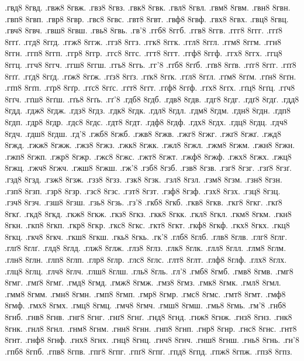 {.гвд8 8гвд.
.гвж8 8гвж.
.гвз8 8гвз.
.гвк8 8гвк.
.гвл8 8гвл.
.гвм8 8гвм.
.гвн8 8гвн.
.гвп8 8гвп.
.гвр8 8гвр.
.гвс8 8гвс.
.гвт8 8гвт.
.гвф8 8гвф.
.гвх8 8гвх.
.гвц8 8гвц.
.гвч8 8гвч.
.гвш8 8гвш.
.гвь8 8гвь.
.гв'8
.ггб8 8ггб.
.ггв8 8ггв.
.ггг8 8ггг.
.ггґ8 8ггґ.
.ггд8 8ггд.
.ггж8 8ггж.
.ггз8 8ггз.
.ггк8 8ггк.
.ггл8 8ггл.
.ггм8 8ггм.
.ггн8 8ггн.
.ггп8 8ггп.
.ггр8 8ггр.
.ггс8 8ггс.
.ггт8 8ггт.
.ггф8 8ггф.
.ггх8 8ггх.
.ггц8 8ггц.
.ггч8 8ггч.
.ггш8 8ггш.
.ггь8 8ггь.
.гг'8
.гґб8 8гґб.
.гґв8 8гґв.
.гґг8 8гґг.
.гґґ8 8гґґ.
.гґд8 8гґд.
.гґж8 8гґж.
.гґз8 8гґз.
.гґк8 8гґк.
.гґл8 8гґл.
.гґм8 8гґм.
.гґн8 8гґн.
.гґп8 8гґп.
.гґр8 8гґр.
.гґс8 8гґс.
.гґт8 8гґт.
.гґф8 8гґф.
.гґх8 8гґх.
.гґц8 8гґц.
.гґч8 8гґч.
.гґш8 8гґш.
.гґь8 8гґь.
.гґ'8
.гдб8 8гдб.
.гдв8 8гдв.
.гдг8 8гдг.
.гдґ8 8гдґ.
.гдд8 8гдд.
.гдж8 8гдж.
.гдз8 8гдз.
.гдк8 8гдк.
.гдл8 8гдл.
.гдм8 8гдм.
.гдн8 8гдн.
.гдп8 8гдп.
.гдр8 8гдр.
.гдс8 8гдс.
.гдт8 8гдт.
.гдф8 8гдф.
.гдх8 8гдх.
.гдц8 8гдц.
.гдч8 8гдч.
.гдш8 8гдш.
.гд'8
.гжб8 8гжб.
.гжв8 8гжв.
.гжг8 8гжг.
.гжґ8 8гжґ.
.гжд8 8гжд.
.гжж8 8гжж.
.гжз8 8гжз.
.гжк8 8гжк.
.гжл8 8гжл.
.гжм8 8гжм.
.гжн8 8гжн.
.гжп8 8гжп.
.гжр8 8гжр.
.гжс8 8гжс.
.гжт8 8гжт.
.гжф8 8гжф.
.гжх8 8гжх.
.гжц8 8гжц.
.гжч8 8гжч.
.гжш8 8гжш.
.гж'8
.гзб8 8гзб.
.гзв8 8гзв.
.гзг8 8гзг.
.гзґ8 8гзґ.
.гзд8 8гзд.
.гзж8 8гзж.
.гзз8 8гзз.
.гзк8 8гзк.
.гзл8 8гзл.
.гзм8 8гзм.
.гзн8 8гзн.
.гзп8 8гзп.
.гзр8 8гзр.
.гзс8 8гзс.
.гзт8 8гзт.
.гзф8 8гзф.
.гзх8 8гзх.
.гзц8 8гзц.
.гзч8 8гзч.
.гзш8 8гзш.
.гзь8 8гзь.
.гз'8
.гкб8 8гкб.
.гкв8 8гкв.
.гкг8 8гкг.
.гкґ8 8гкґ.
.гкд8 8гкд.
.гкж8 8гкж.
.гкз8 8гкз.
.гкк8 8гкк.
.гкл8 8гкл.
.гкм8 8гкм.
.гкн8 8гкн.
.гкп8 8гкп.
.гкр8 8гкр.
.гкс8 8гкс.
.гкт8 8гкт.
.гкф8 8гкф.
.гкх8 8гкх.
.гкц8 8гкц.
.гкч8 8гкч.
.гкш8 8гкш.
.гкь8 8гкь.
.гк'8
.глб8 8глб.
.глв8 8глв.
.глг8 8глг.
.глґ8 8глґ.
.глд8 8глд.
.глж8 8глж.
.глз8 8глз.
.глк8 8глк.
.глл8 8глл.
.глм8 8глм.
.глн8 8глн.
.глп8 8глп.
.глр8 8глр.
.глс8 8глс.
.глт8 8глт.
.глф8 8глф.
.глх8 8глх.
.глц8 8глц.
.глч8 8глч.
.глш8 8глш.
.гль8 8гль.
.гл'8
.гмб8 8гмб.
.гмв8 8гмв.
.гмг8 8гмг.
.гмґ8 8гмґ.
.гмд8 8гмд.
.гмж8 8гмж.
.гмз8 8гмз.
.гмк8 8гмк.
.гмл8 8гмл.
.гмм8 8гмм.
.гмн8 8гмн.
.гмп8 8гмп.
.гмр8 8гмр.
.гмс8 8гмс.
.гмт8 8гмт.
.гмф8 8гмф.
.гмх8 8гмх.
.гмц8 8гмц.
.гмч8 8гмч.
.гмш8 8гмш.
.гмь8 8гмь.
.гм'8
.гнб8 8гнб.
.гнв8 8гнв.
.гнг8 8гнг.
.гнґ8 8гнґ.
.гнд8 8гнд.
.гнж8 8гнж.
.гнз8 8гнз.
.гнк8 8гнк.
.гнл8 8гнл.
.гнм8 8гнм.
.гнн8 8гнн.
.гнп8 8гнп.
.гнр8 8гнр.
.гнс8 8гнс.
.гнт8 8гнт.
.гнф8 8гнф.
.гнх8 8гнх.
.гнц8 8гнц.
.гнч8 8гнч.
.гнш8 8гнш.
.гнь8 8гнь.
.гн'8
.гпб8 8гпб.
.гпв8 8гпв.
.гпг8 8гпг.
.гпґ8 8гпґ.
.гпд8 8гпд.
.гпж8 8гпж.
.гпз8 8гпз.
}
